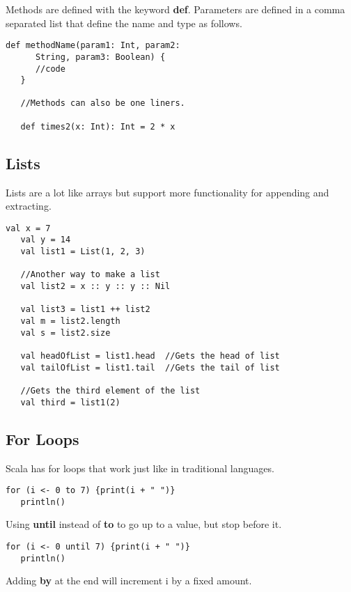 \documentclass[12pt, letterpaper]{report}
\begin{document}
Methods are defined with the keyword \textbf{def}.
Parameters are defined in a comma separated list that define the name and type as follows.

\begin{lstlisting}[style=scala]
   def methodName(param1: Int, param2: 
      String, param3: Boolean) {
      //code
   }

   //Methods can also be one liners.

   def times2(x: Int): Int = 2 * x 
\end{lstlisting}

\subsection{Lists}
Lists are a lot like arrays but support more functionality for appending and extracting.

\begin{lstlisting}[style=scala]
   val x = 7
   val y = 14
   val list1 = List(1, 2, 3)
   
   //Another way to make a list
   val list2 = x :: y :: y :: Nil	

   val list3 = list1 ++ list2
   val m = list2.length
   val s = list2.size

   val headOfList = list1.head	//Gets the head of list
   val tailOfList = list1.tail	//Gets the tail of list

   //Gets the third element of the list
   val third = list1(2)			
\end{lstlisting}

\subsection{For Loops}

Scala has for loops that work just like in traditional languages.

\begin{lstlisting}[style=scala]
   for (i <- 0 to 7) {print(i + " ")}
   println()
\end{lstlisting}

Using \textbf{until} instead of \textbf{to} to go up to a value, but stop before it. 

\begin{lstlisting}[style=scala]
   for (i <- 0 until 7) {print(i + " ")}
   println()
\end{lstlisting}

Adding \textbf{by} at the end will increment i by a fixed amount.
\end{document}
